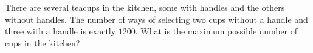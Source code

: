 There are several teacups in the kitchen, some with handles and the others without handles. The number of ways of selecting two cups without a handle and three with a handle is exactly $1200$. What is the maximum possible number of cups in the kitchen?
